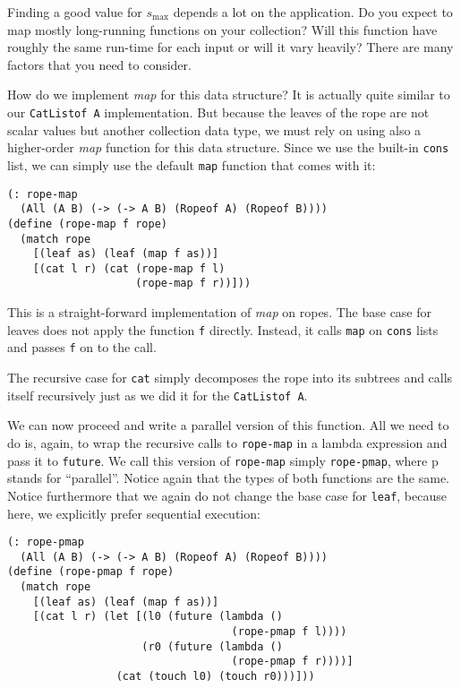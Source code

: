\documentclass{article}
\begin{document}
Finding a good value for $s_{\max}$ depends a lot on the application. Do you expect to map mostly long-running functions on your collection? Will this function have roughly the same run-time for each input or will it vary heavily? There are many factors that you need to consider.

How do we implement \emph{map} for this data structure? It is actually quite similar to our \lstinline{CatListof A} implementation. But because the leaves of the rope are not scalar values but another collection data type, we must rely on using also a higher-order \emph{map} function for this data structure. Since we use the built-in \lstinline{cons} list, we can simply use the default \lstinline{map} function that comes with it:

\begin{center}
\begin{lstlisting}
(: rope-map
  (All (A B) (-> (-> A B) (Ropeof A) (Ropeof B))))
(define (rope-map f rope)
  (match rope
    [(leaf as) (leaf (map f as))]
    [(cat l r) (cat (rope-map f l)
                    (rope-map f r))]))
\end{lstlisting}
\end{center}

This is a straight-forward implementation of \emph{map} on ropes. The base case for leaves does not apply the function \lstinline{f} directly. Instead, it calls \lstinline{map} on \lstinline{cons} lists and passes \lstinline{f} on to the call.

The recursive case for \lstinline{cat} simply decomposes the rope into its subtrees and calls itself recursively just as we did it for the \lstinline{CatListof A}.

We can now proceed and write a parallel version of this function. All we need to do is, again, to wrap the recursive calls to \lstinline{rope-map} in a lambda expression and pass it to \lstinline{future}. We call this version of \lstinline{rope-map} simply \lstinline{rope-pmap}, where p stands for ``parallel''. Notice again that the types of both functions are the same. Notice furthermore that we again do not change the base case for \lstinline{leaf}, because here, we explicitly prefer sequential execution:

\begin{lstlisting}
(: rope-pmap
  (All (A B) (-> (-> A B) (Ropeof A) (Ropeof B))))
(define (rope-pmap f rope)
  (match rope
    [(leaf as) (leaf (map f as))]
    [(cat l r) (let [(l0 (future (lambda ()
                                   (rope-pmap f l))))
                     (r0 (future (lambda ()
                                   (rope-pmap f r))))]
                 (cat (touch l0) (touch r0)))]))
\end{lstlisting}
\end{document}
